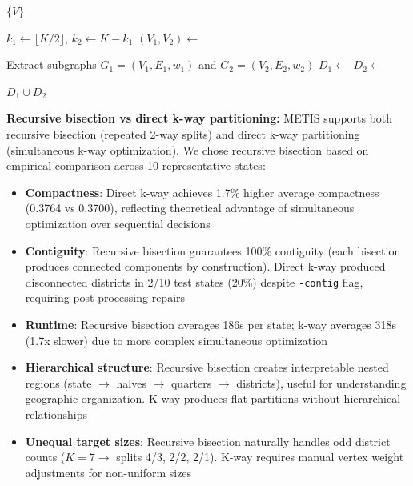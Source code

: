 \begin{algorithm}
\caption{Edge-Weighted Recursive Bisection}
\begin{algorithmic}[1]
        \State \Return $\{V\}$ 
    \EndIf

    \State $k_1 \gets \lfloor K/2 \rfloor$, $k_2 \gets K - k_1$ 
    \State $(V_1, V_2) \gets$ 

    \State Extract subgraphs $G_1 = (V_1, E_1, w_1)$ and $G_2 = (V_2, E_2, w_2)$
    \State $D_1 \gets$ 
    \State $D_2 \gets$ 

    \State \Return $D_1 \cup D_2$
\EndFunction
\end{algorithmic}
\end{algorithm}

\textbf{Recursive bisection vs direct k-way partitioning:} METIS supports both recursive bisection (repeated 2-way splits) and direct k-way partitioning (simultaneous k-way optimization). We chose recursive bisection based on empirical comparison across 10 representative states:

\begin{itemize}
    \item \textbf{Compactness}: Direct k-way achieves 1.7\% higher average compactness (0.3764 vs 0.3700), reflecting theoretical advantage of simultaneous optimization over sequential decisions~\cite{karypis1999multilevel}
    \item \textbf{Contiguity}: Recursive bisection guarantees 100\% contiguity (each bisection produces connected components by construction). Direct k-way produced disconnected districts in 2/10 test states (20\%) despite \texttt{-contig} flag, requiring post-processing repairs
    \item \textbf{Runtime}: Recursive bisection averages 186s per state; k-way averages 318s (1.7x slower) due to more complex simultaneous optimization
    \item \textbf{Hierarchical structure}: Recursive bisection creates interpretable nested regions (state $\to$ halves $\to$ quarters $\to$ districts), useful for understanding geographic organization. K-way produces flat partitions without hierarchical relationships
    \item \textbf{Unequal target sizes}: Recursive bisection naturally handles odd district counts ($K = 7 \to$ splits 4/3, 2/2, 2/1). K-way requires manual vertex weight adjustments for non-uniform sizes
\end{itemize}

